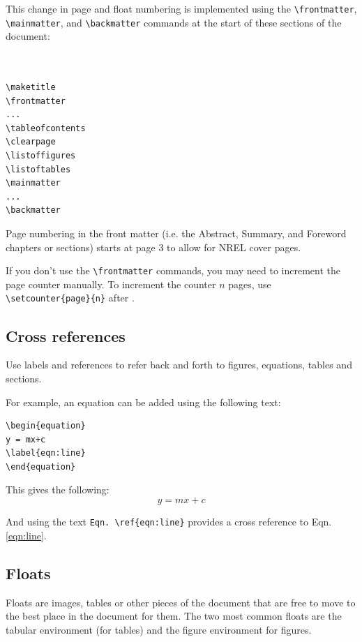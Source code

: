 This change in page and float numbering is implemented using the \verb+\frontmatter+, \verb+\mainmatter+, and \verb+\backmatter+ commands at the start of these sections of the document:

\begin{lstlisting}


\maketitle
\frontmatter
...
\tableofcontents
\clearpage
\listoffigures
\listoftables
\mainmatter
...
\backmatter

\end{lstlisting}

Page numbering in the front matter (i.e. the Abstract, Summary, and Foreword chapters or sections) starts at page 3 to allow for NREL cover pages.

If you don't use the \verb+\frontmatter+ commands, you may need to increment the page counter manually. To increment the counter $n$ pages, use \verb+\setcounter{page}{n}+ after \verb++.

\subsection{Cross references}
Use labels and references to refer back and forth to figures, equations, tables and sections. 

For example, an equation can be added using the following text:

\begin{lstlisting}
\begin{equation}
y = mx+c
\label{eqn:line}
\end{equation}
\end{lstlisting}

This gives the following:
\begin{equation}
y = mx+c
\label{eqn:line}
\end{equation}

And using the text \verb+Eqn. \ref{eqn:line}+ provides a cross reference to Eqn. \ref{eqn:line}.

\subsection{Floats}
Floats are images, tables or other pieces of the document that are free to move to the best place in the document for them. The two most common floats are the tabular environment (for tables) and the figure environment for figures.

